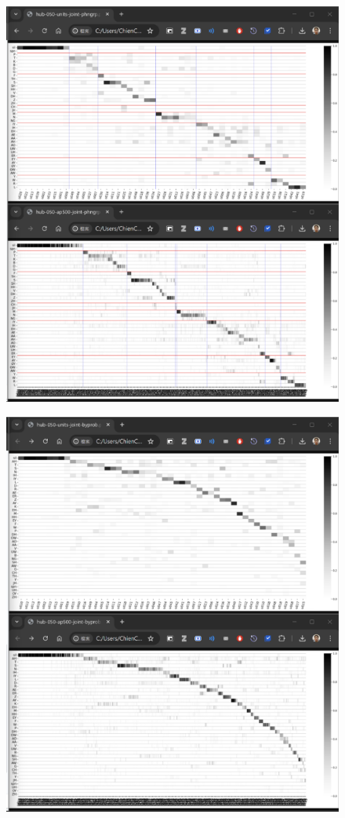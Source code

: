 {
\begin{figure}
    \centering
    \includegraphics[width=1\linewidth]{feasiblefigs/ch4figs/drafts/1.png}
\end{figure}
}
{
\begin{figure}
    \centering
    \includegraphics[width=1\linewidth]{feasiblefigs/ch4figs/drafts/2.png}
\end{figure}
}
